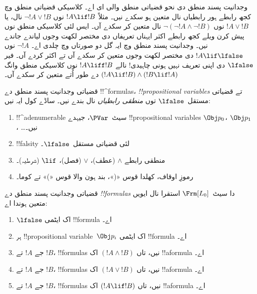 \documentclass[../../../include/open-logic-section]{subfiles}
\begin{document}


وجدانیت پسند منطق دی نحو قضیاتی منطق والی ای اے۔ کلاسیکی
قضیاتی منطق وچ کجھ رابطے ہور رابطیاں نال متعین ہو سکدے نیں۔
مثلاً $!A \lif !B$ نوں $\lnot !A \lor !B$ نال، یا $!A \lor !B$
نوں $\lnot(\lnot !A \land \lnot !B)$ نال متعین کر سکدے آں۔
ایس لئی کلاسیکی منطق نوں پیش کرن ویلے کجھ رابطے اکثر ایہناں
تعریفاں دی مختصر لکھت وجوں لیاندے جاندے نیں۔ وجدانیت پسند منطق
وچ ایہ گل دو صورتاں وچ چلدی اے۔ $\lnot !A$ نوں $!A \lif \lfalse$
دی مختصر لکھت وجوں متعین کر سکدے آں تے اکثر کردے آں۔ فیر
$\lfalse$ دی اپنی تعریف نہیں ہونی چاہیدی!{} نالے $!A \liff !B$
نوں کلاسیکی منطق وانگ $(!A \lif !B) \land (!B \lif !A)$
دے طور اُتے متعین کر سکدے آں۔

قضیاتی وجدانیت پسند منطق دے !!^{formula}s،
\emph{!!{propositional variable}s} تے قضیاتی مستقل~$\lfalse$ توں
\emph{منطقی رابطیاں} نال بندے نیں۔ ساڈے کول ایہ نیں:

\begin{enumerate}
\item !!^a{denumerable} سیٹ~$\PVar$، جیہدے !!{propositional variable}s
  $\Obj p_0$، $\Obj p_1$، \dots نیں۔
\item !!{falsity} لئی قضیاتی مستقل~$\lfalse$۔
\item منطقی رابطے $\land$ (عطف)، $\lor$ (فصل)، $\lif$ (شرطیہ)۔
\item رموزِ اوقاف، کھلدا قوس «(»، بند ہون والا قوس «)» تے کوما۔
\end{enumerate}

\begin{defn}[فارمولا]
 قضیاتی وجدانیت پسند منطق دے
\emph{!!{formula}s} دا سیٹ~$\Frm[L_0]$ استقرا نال ایویں متعین ہوندا اے:
\begin{enumerate}
\item $\lfalse$ اک ایٹمی !!{formula} اے۔

\item ہر !!{propositional variable}~$\Obj p_i$ اک ایٹمی
  !!{formula} اے۔

\item جے $!A$ تے $!B$، !!{formula}s نیں، تاں $(!A \land
  !B)$ اک !!a{formula} اے۔

\item جے $!A$ تے $!B$، !!{formula}s نیں، تاں $(!A \lor !B)$
  اک !!a{formula} اے۔

\item جے $!A$ تے $!B$، !!{formula}s نیں، تاں $(!A \lif !B)$
  اک !!a{formula} اے۔

\end{enumerate}
\end{defn}
\end{document}
